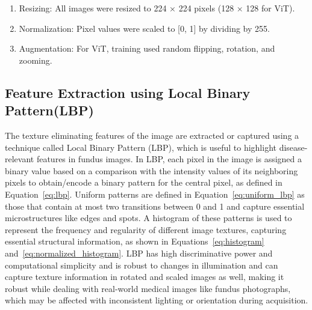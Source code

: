 \documentclass{ijclclp}
\begin{document}
\begin{enumerate}
    \item Resizing: All images were resized to 224 × 224 pixels (128 × 128 for ViT).
    \item Normalization: Pixel values were scaled to [0, 1] by dividing by 255.
    \item Augmentation: For ViT, training used random flipping, rotation, and zooming.
\end{enumerate}

\subsection{Feature Extraction using Local Binary Pattern(LBP)}
\vspace{1em}
\justifying
The texture eliminating features of the image are extracted or captured using a technique called Local Binary Pattern (LBP), which is useful to highlight disease-relevant features in fundus images. In LBP, each pixel in the image is assigned a binary value based on a comparison with the intensity values of its neighboring pixels to obtain/encode a binary pattern for the central pixel, as defined in Equation~\eqref{eq:lbp}. Uniform patterns are defined in Equation~\eqref{eq:uniform_lbp} as those that contain at most two transitions between 0 and 1 and capture essential microstructures like edges and spots. A histogram of these patterns is used to represent the frequency and regularity of different image textures, capturing essential structural information, as shown in Equations~\eqref{eq:histogram} and~\eqref{eq:normalized_histogram}. LBP has high discriminative power and computational simplicity and is robust to changes in illumination and can capture texture information in rotated and scaled images as well, making it robust while dealing with real-world medical images like fundus photographs, which may be affected with inconsistent lighting or orientation during acquisition.
\end{document}
